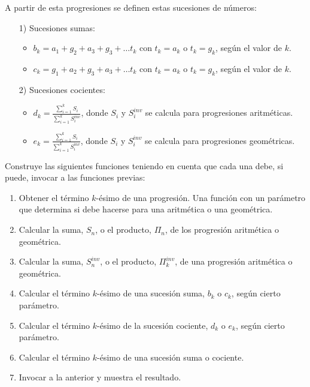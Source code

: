A partir de esta progresiones se definen estas sucesiones de números:
\begin{itemize}
\item[1)]  Sucesiones sumas:
	\begin{itemize}
	\item $b_k = a_1 + g_2 + a_3 + g_3 + \ldots t_k$ con $t_k=a_k$ o $t_k=g_k$, según el valor de $k$.
	\item  $c_k = g_1 + a_2 + g_3 + a_3 + \ldots t_k$ con $t_k=a_k$ o $t_k=g_k$, según el valor de $k$.
	\end{itemize}
\item[2)] Sucesiones cocientes:
	\begin{itemize}
	\item  $d_k = \displaystyle \frac{\displaystyle\sum_{i=1}^k  S_i }{\displaystyle\sum_{i=1}^k  S_i^{inv}}$, donde $S_i$ y $S_i^{inv}$ se calcula para progresiones aritméticas.
	\item  $e_k = \displaystyle\frac{\displaystyle\sum_{i=1}^k  S_i }{\displaystyle\sum_{i=1}^k  S_i^{inv}}$, donde $S_i$ y $S_i^{inv}$ se calcula para progresiones geométricas.
	\end{itemize}
\end{itemize}

Construye las siguientes funciones teniendo en cuenta que cada una debe, si puede, invocar a las funciones previas:

\begin{enumerate}
\item Obtener el término $k$-ésimo de una progresión. Una función con un parámetro que determina si debe hacerse para una aritmética o una geométrica.
\item Calcular la suma, $S_n$, o el producto, $\Pi_n$, de los  progresión aritmética o geométrica. 
\item Calcular la suma, $S^{inv}_n$, o el producto, $\Pi_k^{inv}$, de una progresión aritmética o geométrica.
\item Calcular el término $k$-ésimo de una sucesión suma, $b_k$ o $c_k$, según cierto parámetro.
\item Calcular el término $k$-ésimo de la sucesión cociente,  $d_k$ o $e_k$, según cierto parámetro.
\item Calcular el término $k$-ésimo de una sucesión suma o cociente.
\item Invocar a la anterior y muestra el resultado.
\end{enumerate}


